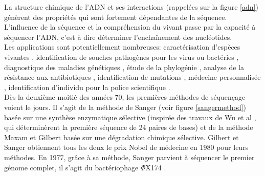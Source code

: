 La structure chimique de l'ADN et ses interactions (rappelées sur la figure \ref{adn}) génèrent des propriétés qui sont fortement dépendantes de la séquence. L'influence de la séquence et la compréhension du vivant passe par la capacité à séquencer l'ADN, c'est à dire déterminer l'enchaînement des nucléotides. \\

Les applications sont potentiellement nombreuses: caractérisation d'espèces vivantes \cite{Sanggaard2014}, identification de souches pathogènes pour les virus ou bactéries \cite{Janda2007}, diagnostique des maladies génétiques \cite{Saunders2012}, étude de la phylogénie \cite{Neves2011}, analyse de la résistance aux antibiotiques  \cite{Davies2010}, identification de mutations \cite{Schneeberger2009}, médecine personnalisée \cite{Hamburg2010}, identification d'individu pour la police scientifique \cite{Wilson1995}.\\


Dès la deuxième moitié des années 70, les premières méthodes de séquençage voient le jours. Il s'agit de la méthode de Sanger \cite{Sanger1975} (voir figure \ref{sangermethod}) basée sur une synthèse enzymatique sélective (inspirée des travaux de Wu et al \cite{WU1972}, qui déterminèrent la première séquence de 24 paires de bases) et de la méthode Maxam et Gilbert \cite{Maxam1977} basée sur une dégradation chimique sélective. Gilbert et Sanger obtiennent tous les deux le prix Nobel de médecine en 1980 pour leurs méthodes. En 1977, grâce à sa méthode, Sanger parvient à séquencer le premier génome complet, il s'agit du bactériophage $\Phi$X174 \cite{Sanger1977}.\\


